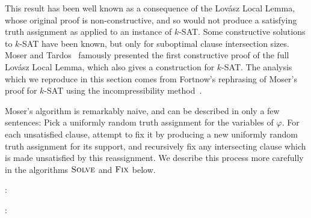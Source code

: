 \documentclass{patmorin}
\begin{document}
This result has been well known as a consequence of the Lov\'{a}sz
Local Lemma, whose original proof is non-constructive, and so would
not produce a satisfying truth assignment as applied to an instance of
$k$-SAT. Some constructive solutions to $k$-SAT have been known, but
only for suboptimal clause intersection sizes. Moser and
Tardos~\cite{moser:locallemma} famously presented the first
constructive proof of the full Lov\'{a}sz Local Lemma, which also
gives a construction for $k$-SAT. The analysis which we reproduce in
this section comes from Fortnow's rephrasing of Moser's proof for
$k$-SAT using the incompressibility method~\cite{fortnow:ksat}.

Moser's algorithm is remarkably naive, and can be described in only a
few sentences: Pick a uniformly random truth assignment for the
variables of $\varphi$. For each unsatisfied clause, attempt to fix it
by producing a new uniformly random truth assignment for its support,
and recursively fix any intersecting clause which is made unsatisfied
by this reassignment. We describe this process more carefully in the
algorithms $\textsc{Solve}$ and $\textsc{Fix}$ below.

:
\begin{algorithmic}[1]
  \ENDWHILE
  \RETURN{$\alpha$}
\end{algorithmic}

:
\begin{algorithmic}[1]
  \ENDWHILE
  \RETURN{$\alpha$}
\end{algorithmic}
\end{document}
